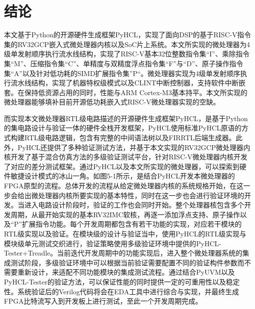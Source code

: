 \chapter{结\texorpdfstring{\quad}{}论}

本文基于Python的开源硬件生成框架PyHCL，实现了面向DSP的基于RISC-V指令集的RV32GCP嵌入式微处理器内核以及SoC片上系统。本文所实现的微处理器为4级单发射顺序执行流水线结构，实现了RISC-V基本32位整数指令集“I”、乘除指令集“M”、压缩指令集“C”、单精度与双精度浮点指令集“F”与“D”、原子操作指令集“A”以及针对低功耗的SIMD扩展指令集”P“。微处理器实现为4级单发射顺序执行流水线结构，实现了机器特权级模式以及CLINT中断控制器，支持软件中断嵌套。在保持低资源占用的同时，性能与ARM Cortex-M3基本持平。本文所实现的微处理器能够填补目前开源低功耗嵌入式RISC-V微处理器实现的空缺。

而实现本文微处理器RTL级电路描述的开源硬件生成框架PyHCL，是基于Python的集电路设计与验证一体的硬件全栈开发框架，PyHCL使用标准PyHCL原语的方式构建RTL级电路逻辑，包含有完整的中间语法树以及FIRRTL后端生成器。此外，PyHCL还提供了多种验证测试方法，并基于本文实现的RV32GCP微处理器内核开发了基于混合仿真方法的多级验证测试平台，针对RISC-V微处理器内核开发了对应的差分测试框架。通过PyHCL以及本文所实现的微处理器，可以探索到硬件敏捷设计模式的冰山一角。如图5-1所示，是结合PyHCL开发本微处理器的FPGA原型的流程。总体开发的流程从给定微处理器内核的系统规格开始，在这一步会给出微处理器内核所要实现的基本特性，同时在这一步也会进行验证环境的开发。当进入电路设计阶段时，验证的工作也会同时开始。整个处理器核包含多个开发周期，从最开始实现的基本RV32IMC软核，再逐一添加浮点支持、原子操作以及“P”扩展指令功能。每个开发周期都包含有若干功能的实现，对应若干模块的RTL级实现以及验证。在模块级的设计与验证当中，使用PyHCL的RTL级实现与模块级单元测试交织进行，验证策略使用多级验证环境中提供的PyHCL-Tester+Treadle。当前迭代开发周期中的功能实现后，进入整个微处理器系统的集成测试阶段，多级验证环境中可以根据当前验证需要配置不同的验证构件参数而不需要重新设计，来适配不同功能模块的集成测试流程。通过结合PyUVM以及PyHCL-Tester的验证方法，可以保证性能的同时提供一定的可重用性以及稳定性。系统验证后的Verilog代码将会在EDA工具中进行综合与实现，并最终生成FPGA比特流写入到开发板上进行测试，至此一个开发周期完成。

